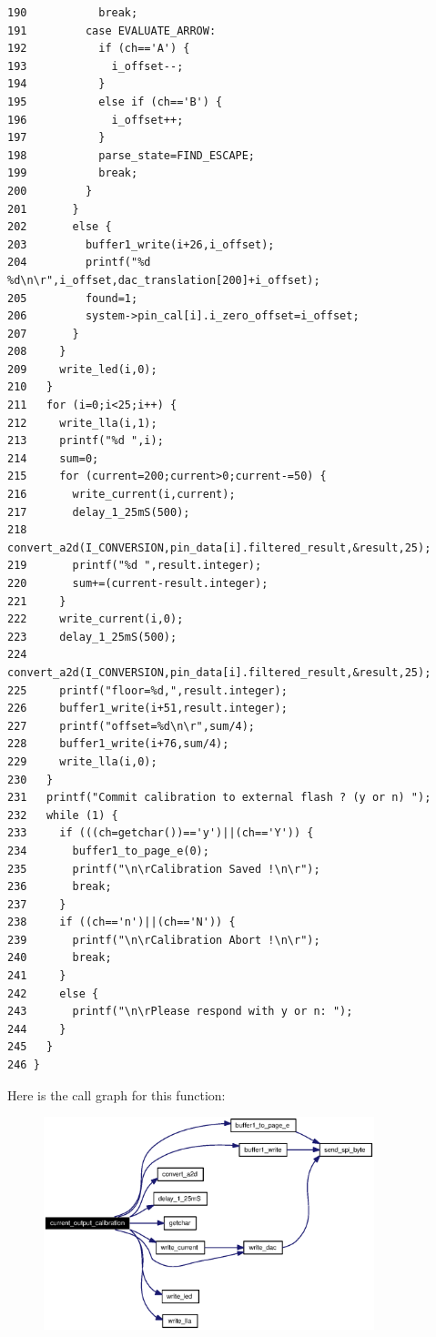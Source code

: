 \begin{verbatim}
190           break;
191         case EVALUATE_ARROW: 
192           if (ch=='A') {
193             i_offset--;
194           }
195           else if (ch=='B') {
196             i_offset++;
197           }
198           parse_state=FIND_ESCAPE;
199           break;
200         }
201       }
202       else {
203         buffer1_write(i+26,i_offset);
204         printf("%d %d\n\r",i_offset,dac_translation[200]+i_offset);
205         found=1;
206         system->pin_cal[i].i_zero_offset=i_offset;
207       }
208     }
209     write_led(i,0);
210   }
211   for (i=0;i<25;i++) {
212     write_lla(i,1);
213     printf("%d ",i);
214     sum=0;
215     for (current=200;current>0;current-=50) {
216       write_current(i,current);
217       delay_1_25mS(500);
218       convert_a2d(I_CONVERSION,pin_data[i].filtered_result,&result,25);
219       printf("%d ",result.integer);
220       sum+=(current-result.integer);
221     }
222     write_current(i,0);
223     delay_1_25mS(500);
224     convert_a2d(I_CONVERSION,pin_data[i].filtered_result,&result,25);
225     printf("floor=%d,",result.integer);
226     buffer1_write(i+51,result.integer);
227     printf("offset=%d\n\r",sum/4);
228     buffer1_write(i+76,sum/4);
229     write_lla(i,0);
230   }
231   printf("Commit calibration to external flash ? (y or n) ");
232   while (1) {
233     if (((ch=getchar())=='y')||(ch=='Y')) {
234       buffer1_to_page_e(0);
235       printf("\n\rCalibration Saved !\n\r");
236       break;
237     }
238     if ((ch=='n')||(ch=='N')) {
239       printf("\n\rCalibration Abort !\n\r");
240       break;
241     }
242     else {
243       printf("\n\rPlease respond with y or n: ");
244     }
245   }
246 }
\end{verbatim}\normalsize 




Here is the call graph for this function:\begin{figure}[H]
\begin{center}
\leavevmode
\includegraphics[width=272pt]{calibrate_8c_a3_cgraph}
\end{center}
\end{figure}

